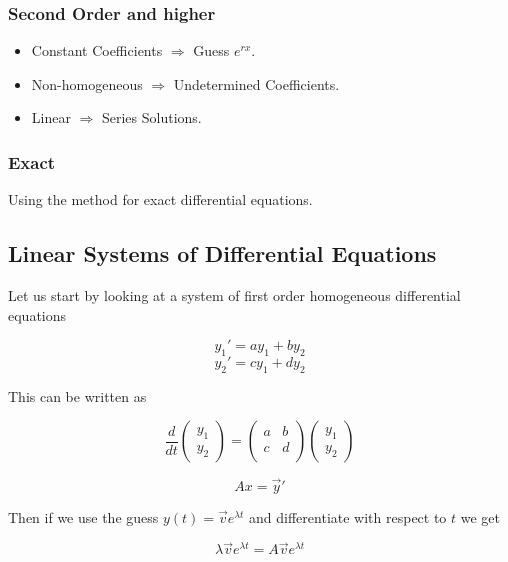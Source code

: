 \subsubsection{Second Order and higher}

\begin{itemize}

    \item Constant Coefficients \(\Rightarrow\) Guess \(e^{rx}\).

    \item Non-homogeneous \(\Rightarrow\) Undetermined Coefficients.

    \item Linear \(\Rightarrow\) Series Solutions.

\end{itemize}

\subsubsection{Exact}

Using the method for exact differential equations.

\subsection{Linear Systems of Differential Equations}

Let us start by looking at a system of first order homogeneous differential equations

\[
    y_1 ' = ay_1 + by_2
\]
\[
    y_2 ' = cy_1 + dy_2
\]

This can be written as 

\[
    \frac{d}{dt} 
    \begin{pmatrix} 
    y_1 \\ 
    y_2 
    \end{pmatrix} 
    = 
    \begin{pmatrix}
    a & b \\
    c & d \\
    \end{pmatrix} 
    \begin{pmatrix}
    y_1 \\ 
    y_2
    \end{pmatrix}
\]

\[
    Ax = \vec{y}'
\]

Then if we use the guess \(y(t) = \vec{v} e^{\lambda t}\) and differentiate with respect to \(t\) 
we get 

\[
    \lambda \vec{v} e^{\lambda t} = A \vec{v} e^{\lambda t}
\]

